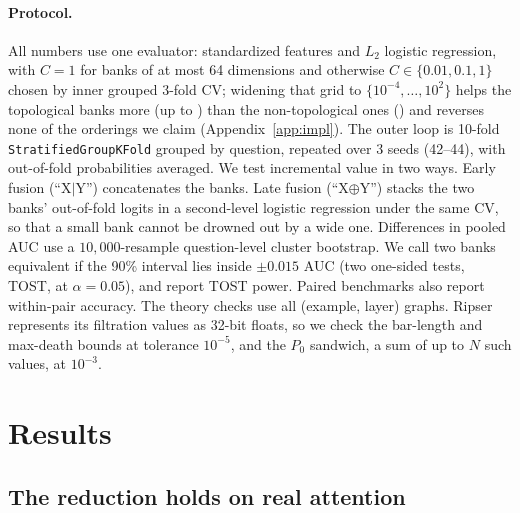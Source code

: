 \documentclass{article}
\theoremstyle{definition}
\newcommand{\defect}{\delta}
\newcommand{\stw}{S}
\begin{document}
\paragraph{Protocol.} All numbers use one evaluator: standardized features and $L_2$ logistic regression, with $C=1$ for banks of at most 64 dimensions and otherwise $C\in\{0.01,0.1,1\}$ chosen by inner grouped 3-fold CV; widening that grid to $\{10^{-4},\dots,10^{2}\}$ helps the topological banks more (up to \CGridTopoMax{}) than the non-topological ones (\CGridNTMax{}) and reverses none of the orderings we claim (Appendix~\ref{app:impl}). The outer loop is 10-fold \texttt{StratifiedGroupKFold} grouped by question, repeated over 3 seeds (42--44), with out-of-fold probabilities averaged. We test incremental value in two ways. Early fusion (``X$\mid$Y'') concatenates the banks. Late fusion (``X$\oplus$Y'') stacks the two banks' out-of-fold logits in a second-level logistic regression under the same CV, so that a small bank cannot be drowned out by a wide one. Differences in pooled AUC use a $10{,}000$-resample question-level cluster bootstrap. We call two banks equivalent if the 90\% interval lies inside $\pm0.015$ AUC (two one-sided tests, TOST, at $\alpha=0.05$), and report TOST power. Paired benchmarks also report within-pair accuracy. The theory checks use all (example, layer) graphs. Ripser \citep{bauer2021ripser} represents its filtration values as 32-bit floats, so we check the bar-length and max-death bounds at tolerance $10^{-5}$, and the $P_0$ sandwich, a sum of up to $N$ such values, at $10^{-3}$.

\section{Results}
\label{sec:results}

\subsection{The reduction holds on real attention}
\label{sec:reduction}

\begin{table}[!t]
\centering
\small
\caption{\textbf{Theorem~\ref{thm:cone} on real attention} ($s=0$). \emph{viol.}: bound violations; \emph{coned}: share with $\defect_0=0$; $H_1{=}\emptyset\,|\,$coned: C2 predicts $100\%$. $\rho$: median over layers of the Spearman correlation across examples of $P_0$ with $\stw_0$ (raw) and of $P_0/(N{-}1)$ with $1-\bar m$ (${/N}$, length removed).}
\label{tab:theory}
\resizebox{\linewidth}{!}{\SinkTableTheory}
\end{table}
\end{document}
